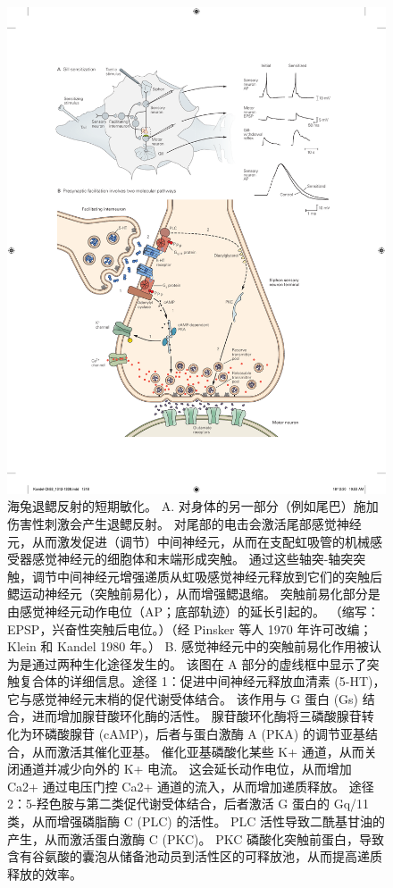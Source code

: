 \begin{figure}[htbp]
	\centering
	\includegraphics[width=0.9\linewidth]{chap53/fig_53_4}
	\caption{海兔退鳃反射的短期敏化。 A. 对身体的另一部分（例如尾巴）施加伤害性刺激会产生退鳃反射。 对尾部的电击会激活尾部感觉神经元，从而激发促进（调节）中间神经元，从而在支配虹吸管的机械感受器感觉神经元的细胞体和末端形成突触。 通过这些轴突-轴突突触，调节中间神经元增强递质从虹吸感觉神经元释放到它们的突触后鳃运动神经元（突触前易化），从而增强鳃退缩。 突触前易化部分是由感觉神经元动作电位（AP；底部轨迹）的延长引起的。 （缩写：EPSP，兴奋性突触后电位。）（经 Pinsker 等人 1970 年许可改编；Klein 和 Kandel 1980 年。） B. 感觉神经元中的突触前易化作用被认为是通过两种生化途径发生的。 该图在 A 部分的虚线框中显示了突触复合体的详细信息。途径 1：促进中间神经元释放血清素 (5-HT)，它与感觉神经元末梢的促代谢受体结合。 该作用与 G 蛋白 (Gs) 结合，进而增加腺苷酸环化酶的活性。 腺苷酸环化酶将三磷酸腺苷转化为环磷酸腺苷 (cAMP)，后者与蛋白激酶 A (PKA) 的调节亚基结合，从而激活其催化亚基。 催化亚基磷酸化某些 K+ 通道，从而关闭通道并减少向外的 K+ 电流。 这会延长动作电位，从而增加 Ca2+ 通过电压门控 Ca2+ 通道的流入，从而增加递质释放。 途径 2：5-羟色胺与第二类促代谢受体结合，后者激活 G 蛋白的 Gq/11 类，从而增强磷脂酶 C (PLC) 的活性。 PLC 活性导致二酰基甘油的产生，从而激活蛋白激酶 C (PKC)。 PKC 磷酸化突触前蛋白，导致含有谷氨酸的囊泡从储备池动员到活性区的可释放池，从而提高递质释放的效率。}
	\label{fig:53_4}
\end{figure}


